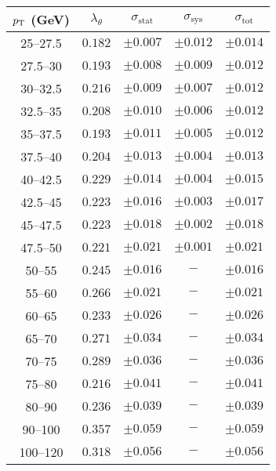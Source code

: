 \begin{tabular}{c|cccc}
$p_\text{T}$ (GeV) & $\lambda_\theta$ & $\sigma_{\text{stat}}$ & $\sigma_{\text{sys}}$ & $\sigma_{\text{tot}}$  \\
\hline
25--27.5& $0.182$ & $\pm0.007$ & $\pm0.012$ & $\pm0.014$\\
27.5--30& $0.193$ & $\pm0.008$ & $\pm0.009$ & $\pm0.012$\\
30--32.5& $0.216$ & $\pm0.009$ & $\pm0.007$ & $\pm0.012$\\
32.5--35& $0.208$ & $\pm0.010$ & $\pm0.006$ & $\pm0.012$\\
35--37.5& $0.193$ & $\pm0.011$ & $\pm0.005$ & $\pm0.012$\\
37.5--40& $0.204$ & $\pm0.013$ & $\pm0.004$ & $\pm0.013$\\
40--42.5& $0.229$ & $\pm0.014$ & $\pm0.004$ & $\pm0.015$\\
42.5--45& $0.223$ & $\pm0.016$ & $\pm0.003$ & $\pm0.017$\\
45--47.5& $0.223$ & $\pm0.018$ & $\pm0.002$ & $\pm0.018$\\
47.5--50& $0.221$ & $\pm0.021$ & $\pm0.001$ & $\pm0.021$\\
50--55& $0.245$ & $\pm0.016$ & $-$ & $\pm0.016$\\
55--60& $0.266$ & $\pm0.021$ & $-$ & $\pm0.021$\\
60--65& $0.233$ & $\pm0.026$ & $-$ & $\pm0.026$\\
65--70& $0.271$ & $\pm0.034$ & $-$ & $\pm0.034$\\
70--75& $0.289$ & $\pm0.036$ & $-$ & $\pm0.036$\\
75--80& $0.216$ & $\pm0.041$ & $-$ & $\pm0.041$\\
80--90& $0.236$ & $\pm0.039$ & $-$ & $\pm0.039$\\
90--100& $0.357$ & $\pm0.059$ & $-$ & $\pm0.059$\\
100--120& $0.318$ & $\pm0.056$ & $-$ & $\pm0.056$\\
\end{tabular}
